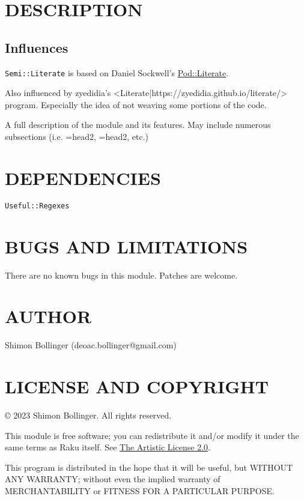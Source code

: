 \documentclass{scrartcl}
\begin{document}
\section{DESCRIPTION}

\subsection{Influences}

\texttt{Semi::Literate} is based on Daniel Sockwell's
\href{https://www.codesections.com/blog/weaving-raku/}{Pod::Literate}.

Also influenced by zyedidia's
<Literate|https://zyedidia.github.io/literate/> program. Especially the
idea of not weaving some portions of the code.

A full description of the module and its features. May include numerous
subsections (i.e. =head2, =head2, etc.)

\section{DEPENDENCIES}

\begin{lstlisting}[language=Perl6]
Useful::Regexes
\end{lstlisting}


\section{BUGS AND LIMITATIONS}

There are no known bugs in this module. Patches are welcome.

\section{AUTHOR}

Shimon Bollinger (deoac.bollinger@gmail.com)

\section{LICENSE AND COPYRIGHT}

© 2023 Shimon Bollinger. All rights reserved.

This module is free software; you can redistribute it and/or modify it
under the same terms as Raku itself. See
\href{https://opensource.org/licenses/Artistic-2.0}{The Artistic License
2.0}.

This program is distributed in the hope that it will be useful, but WITHOUT
ANY WARRANTY; without even the implied warranty of MERCHANTABILITY or
FITNESS FOR A PARTICULAR PURPOSE.
\end{document}
